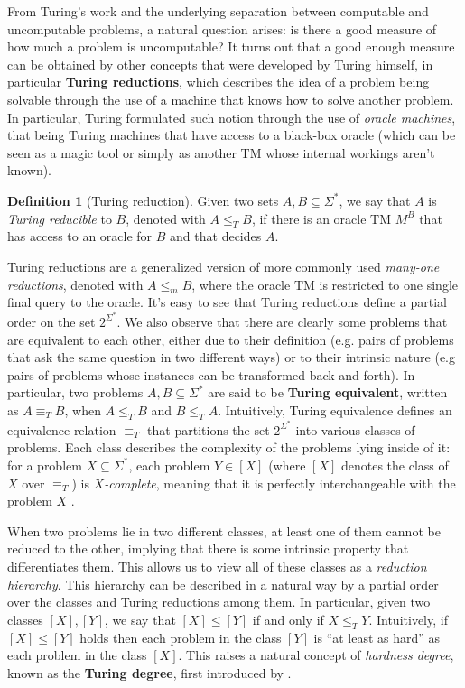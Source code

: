 \documentclass[12pt,a4paper]{article}
\theoremstyle{definition}
\newtheorem{definition}{Definition}
\newcommand{\curlyquotes}[1]{\textquotedblleft #1\textquotedblright}
\begin{document}
    From Turing's work and the underlying separation between computable and uncomputable problems, a natural question arises: is there a good measure of how much a problem is uncomputable? It turns out that a good enough measure can be obtained by other concepts that were developed by Turing himself, in particular \textbf{Turing reductions}, which describes the idea of a problem being solvable through the use of a machine that knows how to solve another problem. In particular, Turing formulated such notion through the use of \textit{oracle machines}, that being Turing machines that have access to a black-box oracle (which can be seen as a magic tool or simply as another TM whose internal workings aren't known).

    \begin{definition}[Turing reduction]
        Given two sets $A, B \subseteq \Sigma^*$, we say that $A$ is \textit{Turing reducible} to $B$, denoted with $A \leq_T B$, if there is an oracle TM $M^B$ that has access to an oracle for $B$ and that decides $A$.
    \end{definition}
    
    Turing reductions are a generalized version of more commonly used \textit{many-one reductions}, denoted with $A \leq_m B$, where the oracle TM is restricted to one single final query to the oracle. It's easy to see that Turing reductions define a partial order on the set $2^{\Sigma^*}$. We also observe that there are clearly some problems that are equivalent to each other, either due to their definition (e.g. pairs of problems that ask the same question in two different ways) or to their intrinsic nature (e.g pairs of problems whose instances can be transformed back and forth). In particular, two problems $A,B \subseteq \Sigma^*$ are said to be \textbf{Turing equivalent}, written as $A \equiv_T B$, when $A \leq_T B$ and $B \leq_T A$. Intuitively, Turing equivalence defines an equivalence relation $\equiv_T$ that partitions the set $2^{\Sigma^*}$ into various classes of problems. Each class describes the complexity of the problems lying inside of it: for a problem $X \subseteq \Sigma^*$, each problem $Y \in [X]$ (where $[X]$ denotes the class of $X$ over $\equiv_T$) is \textit{$X$-complete}, meaning that it is perfectly interchangeable with the problem $X$ \cite{soare_1,soare_2}.
    
    When two problems lie in two different classes, at least one of them cannot be reduced to the other, implying that there is some intrinsic property that differentiates them. This allows us to view all of these classes as a \textit{reduction hierarchy}. This hierarchy can be described in a natural way by a partial order over the classes and Turing reductions among them. In particular, given two classes $[X], [Y]$, we say that $[X] \leq [Y]$ if and only if $X \leq_T Y$. Intuitively, if $[X] \leq [Y]$ holds then each problem in the class $[Y]$ is \curlyquotes{at least as hard} as each problem in the class $[X]$. This raises a natural concept of \textit{hardness degree}, known as the \textbf{Turing degree}, first introduced by \textcite{post_degrees}.
\end{document}
